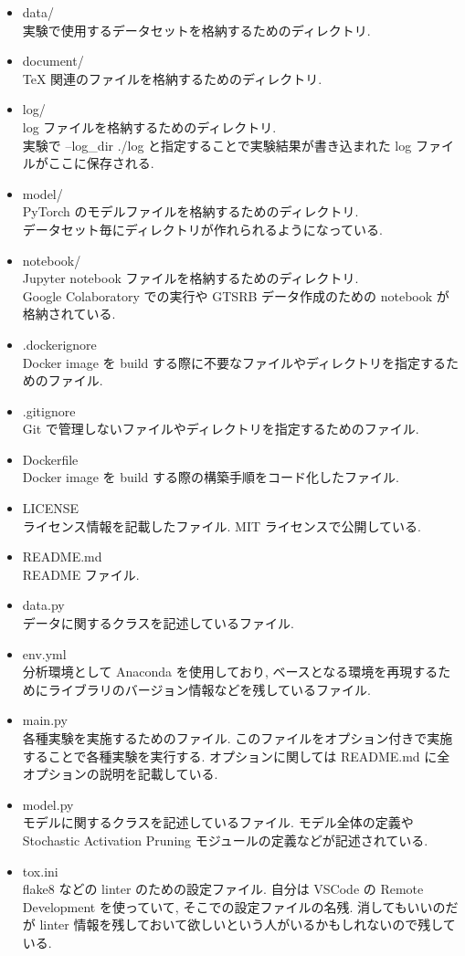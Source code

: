 \begin{itemize}
  \item data/\\
  実験で使用するデータセットを格納するためのディレクトリ.
  \item document/\\
  TeX 関連のファイルを格納するためのディレクトリ.
  \item log/\\
  log ファイルを格納するためのディレクトリ.\\
  実験で --log\_dir ./log と指定することで実験結果が書き込まれた log ファイルがここに保存される.
  \item model/\\
  PyTorch のモデルファイルを格納するためのディレクトリ.\\
  データセット毎にディレクトリが作れられるようになっている.
  \item notebook/\\
  Jupyter notebook ファイルを格納するためのディレクトリ.\\
  Google Colaboratory での実行や GTSRB データ作成のための notebook が格納されている.
  \item .dockerignore\\
  Docker image を build する際に不要なファイルやディレクトリを指定するためのファイル.
  \item .gitignore\\
  Git で管理しないファイルやディレクトリを指定するためのファイル.
  \item Dockerfile\\
  Docker image を build する際の構築手順をコード化したファイル.
  \item LICENSE\\
  ライセンス情報を記載したファイル.
  MIT ライセンスで公開している.
  \item README.md\\
  README ファイル.
  \item data.py\\
  データに関するクラスを記述しているファイル.
  \item env.yml\\
  分析環境として Anaconda を使用しており, ベースとなる環境を再現するためにライブラリのバージョン情報などを残しているファイル.
  \item main.py\\
  各種実験を実施するためのファイル.
  このファイルをオプション付きで実施することで各種実験を実行する.
  オプションに関しては README.md に全オプションの説明を記載している.
  \item model.py\\
  モデルに関するクラスを記述しているファイル.
  モデル全体の定義や Stochastic Activation Pruning モジュールの定義などが記述されている.
  \item tox.ini\\
  flake8 などの linter のための設定ファイル.
  自分は VSCode の Remote Development を使っていて, そこでの設定ファイルの名残.
  消してもいいのだが linter 情報を残しておいて欲しいという人がいるかもしれないので残している.
\end{itemize}
%



